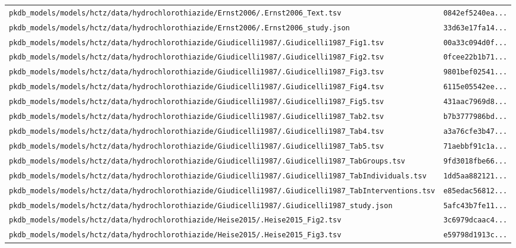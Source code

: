 \begin{longtable}{ll}
\texttt{pkdb\_models/models/hctz/data/hydrochlorothiazide/Ernst2006/.Ernst2006\_Text.tsv} & \texttt{0842ef5240ea...} \\
\texttt{pkdb\_models/models/hctz/data/hydrochlorothiazide/Ernst2006/.Ernst2006\_study.json} & \texttt{33d63e17fa14...} \\
\texttt{pkdb\_models/models/hctz/data/hydrochlorothiazide/Giudicelli1987/.Giudicelli1987\_Fig1.tsv} & \texttt{00a33c094d0f...} \\
\texttt{pkdb\_models/models/hctz/data/hydrochlorothiazide/Giudicelli1987/.Giudicelli1987\_Fig2.tsv} & \texttt{0fcee22b1b71...} \\
\texttt{pkdb\_models/models/hctz/data/hydrochlorothiazide/Giudicelli1987/.Giudicelli1987\_Fig3.tsv} & \texttt{9801bef02541...} \\
\texttt{pkdb\_models/models/hctz/data/hydrochlorothiazide/Giudicelli1987/.Giudicelli1987\_Fig4.tsv} & \texttt{6115e05542ee...} \\
\texttt{pkdb\_models/models/hctz/data/hydrochlorothiazide/Giudicelli1987/.Giudicelli1987\_Fig5.tsv} & \texttt{431aac7969d8...} \\
\texttt{pkdb\_models/models/hctz/data/hydrochlorothiazide/Giudicelli1987/.Giudicelli1987\_Tab2.tsv} & \texttt{b7b3777986bd...} \\
\texttt{pkdb\_models/models/hctz/data/hydrochlorothiazide/Giudicelli1987/.Giudicelli1987\_Tab4.tsv} & \texttt{a3a76cfe3b47...} \\
\texttt{pkdb\_models/models/hctz/data/hydrochlorothiazide/Giudicelli1987/.Giudicelli1987\_Tab5.tsv} & \texttt{71aebbf91c1a...} \\
\texttt{pkdb\_models/models/hctz/data/hydrochlorothiazide/Giudicelli1987/.Giudicelli1987\_TabGroups.tsv} & \texttt{9fd3018fbe66...} \\
\texttt{pkdb\_models/models/hctz/data/hydrochlorothiazide/Giudicelli1987/.Giudicelli1987\_TabIndividuals.tsv} & \texttt{1dd5aa882121...} \\
\texttt{pkdb\_models/models/hctz/data/hydrochlorothiazide/Giudicelli1987/.Giudicelli1987\_TabInterventions.tsv} & \texttt{e85edac56812...} \\
\texttt{pkdb\_models/models/hctz/data/hydrochlorothiazide/Giudicelli1987/.Giudicelli1987\_study.json} & \texttt{5afc43b7fe11...} \\
\texttt{pkdb\_models/models/hctz/data/hydrochlorothiazide/Heise2015/.Heise2015\_Fig2.tsv} & \texttt{3c6979dcaac4...} \\
\texttt{pkdb\_models/models/hctz/data/hydrochlorothiazide/Heise2015/.Heise2015\_Fig3.tsv} & \texttt{e59798d1913c...} \\

\end{longtable}
